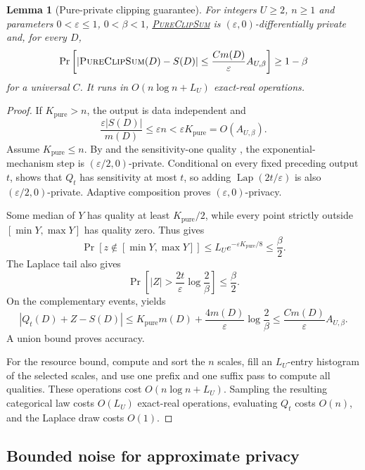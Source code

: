 \documentclass[11pt]{article}
\newtheorem{lemma}{Lemma}[section]
\begin{document}
\begin{lemma}[Pure-private clipping guarantee]
\label{lem:pure-upper}
For integers $U\ge2$, $n\ge1$ and parameters
$0<\varepsilon\le1$, $0<\beta<1$,
\hyperref[alg:pure-clip-sum]{\textsc{PureClipSum}} is
$(\varepsilon,0)$-differentially private and, for every $D$,
\[
 \Pr\left[
  |\text{\textsc{PureClipSum}}(D)-S(D)|
  \le\frac{C m(D)}\varepsilon A_{U,\beta}
 \right]\ge1-\beta
\]
for a universal $C$.  It runs in $O(n\log n+L_U)$ exact-real operations.
\end{lemma}

\begin{proof}
If $K_{\mathrm{pure}}>n$, the output is data independent and
\[
 \frac{\varepsilon|S(D)|}{m(D)}
 \le\varepsilon n<\varepsilon K_{\mathrm{pure}}=O(A_{U,\beta}).
\]
Assume $K_{\mathrm{pure}}\le n$.  By
 and the sensitivity-one quality
, the exponential-mechanism step is
$(\varepsilon/2,0)$-private.  Conditional on every fixed preceding output
$t$,  shows that $Q_t$ has sensitivity at most
$t$, so adding $\operatorname{Lap}(2t/\varepsilon)$ is also
$(\varepsilon/2,0)$-private.  Adaptive composition proves
$(\varepsilon,0)$-privacy.

Some median of $Y$ has quality at least $K_{\mathrm{pure}}/2$, while every
point strictly outside $[\min Y,\max Y]$ has quality zero.  Thus
 gives
\[
 \Pr[z\notin[\min Y,\max Y]]
 \le L_Ue^{-\varepsilon K_{\mathrm{pure}}/8}
 \le\frac\beta2.
\]
The Laplace tail  also gives
\[
 \Pr\left[|Z|>\frac{2t}{\varepsilon}\log\frac2\beta\right]
 \le\frac\beta2.
\]
On the complementary events,  yields
\[
 |Q_t(D)+Z-S(D)|
 \le K_{\mathrm{pure}}m(D)
   +\frac{4m(D)}\varepsilon\log\frac2\beta
 \le\frac{C m(D)}\varepsilon A_{U,\beta}.
\]
A union bound proves accuracy.

For the resource bound, compute and sort the $n$ scales, fill an
$L_U$-entry histogram of the selected scales, and use one prefix and one
suffix pass to compute all qualities.  These operations cost
$O(n\log n+L_U)$.  Sampling the resulting categorical law costs $O(L_U)$
exact-real operations, evaluating $Q_t$ costs $O(n)$, and the Laplace draw
costs $O(1)$.
\end{proof}

\subsection{Bounded noise for approximate privacy}
\end{document}
